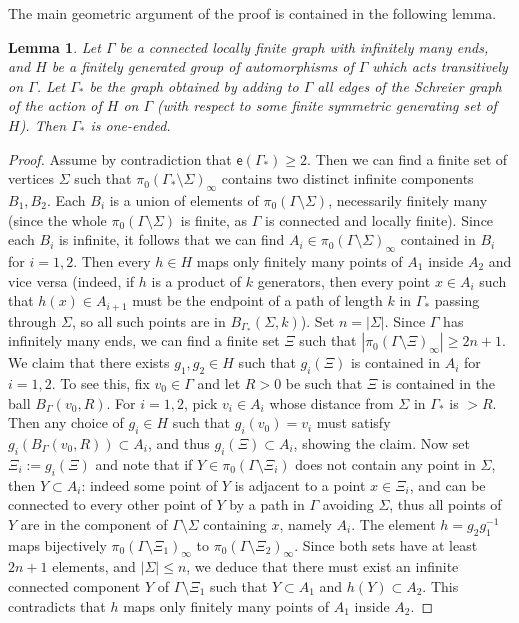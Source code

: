 \documentclass[11pt]{amsart}
\newcommand{\esf}{\ensuremath{\mathsf{e}}}
\theoremstyle{definition}
\theoremstyle{plain}
\newtheorem{main thm}{Theorem}
\newtheorem{lemma}[defin]{Lemma}
\theoremstyle{remark}
\theoremstyle{plain}
\begin{document}
The main geometric argument of the proof is contained in the following lemma.
		\begin{lemma}\label{l-geometric-argument}
		Let $\Gamma$ be a connected locally finite graph with infinitely many ends, and $H$ be a finitely generated group of automorphisms of $\Gamma$ which acts transitively on $\Gamma$. Let $\Gamma_*$ be the graph obtained by adding to $\Gamma$ all edges of the Schreier graph of the action of $H$ on $\Gamma$ (with respect to some finite symmetric generating set of $H$). Then $\Gamma_*$ is one-ended.
\end{lemma}

\begin{proof}
Assume by contradiction that $\esf(\Gamma_*)\ge 2$. Then we can find a finite set of vertices $\Sigma$ such that  $\pi_0(\Gamma_*\setminus \Sigma)_\infty$ contains two distinct infinite components $B_1, B_2$. Each $B_i$ is a union of elements of  $\pi_0(\Gamma\setminus \Sigma)$, necessarily finitely many (since the whole $\pi_0(\Gamma\setminus \Sigma)$ is finite, as $\Gamma$ is connected and locally finite).  Since each $B_i$ is infinite, it follows that we can find  $A_i\in\pi_0( \Gamma \setminus \Sigma)_\infty$ contained in $B_i$ for $i=1, 2$. 
Then every $h\in H$ maps only finitely many points of $A_1$ inside $A_2$ and vice versa (indeed, if $h$ is a product of $k$ generators, then every point $x\in A_i$ such that $h(x)\in A_{i+1}$ must be the endpoint of a path of length $k$ in $\Gamma_\ast$ passing through $\Sigma$, so all such points are in $B_{\Gamma_\ast}(\Sigma, k)$). Set $n=|\Sigma|$. Since $\Gamma$ has infinitely many ends, we can find a finite set $\Xi$ such that $|\pi_0(\Gamma \setminus \Xi)_\infty|\ge 2n+1$. We claim that there exists $g_1, g_2\in H$ such that $g_i(\Xi)$ is contained in $A_i$ for $i=1, 2$. To see this, fix $v_0\in \Gamma$ and let $R>0$ be such that $\Xi$ is contained in the ball $B_\Gamma(v_0, R)$.  For $i=1, 2$, pick $v_i\in A_i$ whose distance from $\Sigma$ in $\Gamma_*$ is $>R$. Then any choice of $g_i\in H$  such that $g_i(v_0)=v_i$ must satisfy $g_i(B_\Gamma(v_0, R))\subset A_i$, and thus $g_i(\Xi)\subset A_i$, showing the claim. Now set $\Xi_i:= g_i(\Xi)$ and note that if $Y\in\pi_0(\Gamma \setminus \Xi_i)$  does not contain any point in $\Sigma$, then $Y\subset A_i$: indeed some point of $Y$ is adjacent to a point $x\in \Xi_i$, and can be connected to every other point of $Y$ by a path in $\Gamma$ avoiding $\Sigma$, thus all points of $Y$ are in the component of $\Gamma\setminus \Sigma$ containing $x$, namely $A_i$. The element $h=g_2g_1^{-1}$ maps bijectively  $\pi_0(\Gamma \setminus \Xi_1)_\infty$ to  $\pi_0(\Gamma \setminus \Xi_2)_\infty$. Since both sets have at least $2n+1$ elements, and $|\Sigma|\le n$, we deduce that there must exist an infinite connected component $Y$ of $\Gamma \setminus \Xi_1$ such that $Y\subset A_1$ and  $h(Y)\subset A_2$. This contradicts that $h$ maps only finitely many points of $A_1$ inside $A_2$. \qedhere 
\end{proof}
\end{document}
